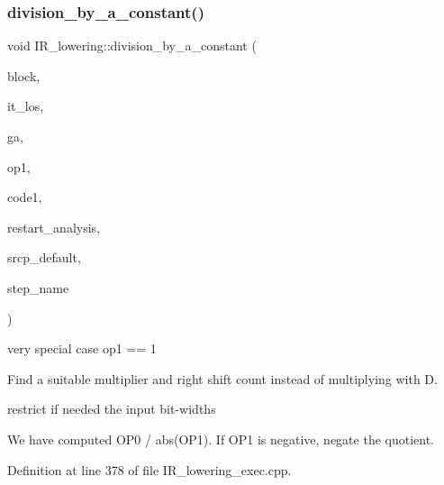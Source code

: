 \subsubsection{\texorpdfstring{division\+\_\+by\+\_\+a\+\_\+constant()}{division\_by\_a\_constant()}}
{\footnotesize\ttfamily void I\+R\+\_\+lowering\+::division\+\_\+by\+\_\+a\+\_\+constant (\begin{DoxyParamCaption}\item[{const std\+::pair$<$ unsigned int, bloc\+Ref $>$ \&}]{block,  }\item[{std\+::list$<$ \hyperlink{tree__node_8hpp_a6ee377554d1c4871ad66a337eaa67fd5}{tree\+\_\+node\+Ref} $>$\+::const\+\_\+iterator \&}]{it\+\_\+los,  }\item[{\hyperlink{structgimple__assign}{gimple\+\_\+assign} $\ast$}]{ga,  }\item[{\hyperlink{tree__node_8hpp_a6ee377554d1c4871ad66a337eaa67fd5}{tree\+\_\+node\+Ref}}]{op1,  }\item[{enum \hyperlink{tree__common_8hpp_a9efbd7c7191fb190b76c2fd05d6e7b45}{kind}}]{code1,  }\item[{bool \&}]{restart\+\_\+analysis,  }\item[{const std\+::string \&}]{srcp\+\_\+default,  }\item[{const std\+::string \&}]{step\+\_\+name }\end{DoxyParamCaption})\hspace{0.3cm}{\ttfamily [private]}}

very special case op1 == 1

Find a suitable multiplier and right shift count instead of multiplying with D.

restrict if needed the input bit-\/widths

We have computed O\+P0 / abs(\+O\+P1). If O\+P1 is negative, negate the quotient. 

Definition at line 378 of file I\+R\+\_\+lowering\+\_\+exec.\+cpp.



